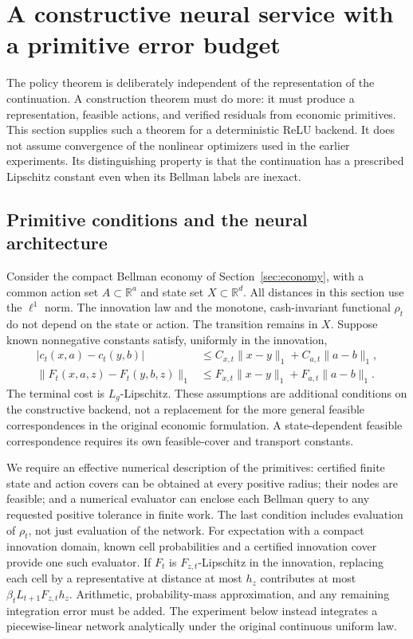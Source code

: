 \section{A constructive neural service with a primitive error budget}\label{sec:constructive45}
The policy theorem is deliberately independent of the representation of the continuation. A construction theorem must do more: it must produce a representation, feasible actions, and verified residuals from economic primitives. This section supplies such a theorem for a deterministic ReLU backend. It does not assume convergence of the nonlinear optimizers used in the earlier experiments. Its distinguishing property is that the continuation has a prescribed Lipschitz constant even when its Bellman labels are inexact.

\subsection{Primitive conditions and the neural architecture}
Consider the compact Bellman economy of Section~\ref{sec:economy}, with a common action set $A\subset\mathbb R^a$ and state set $X\subset\mathbb R^d$. All distances in this section use the $\ell^1$ norm. The innovation law and the monotone, cash-invariant functional $\rho_t$ do not depend on the state or action. The transition remains in $X$. Suppose known nonnegative constants satisfy, uniformly in the innovation,
\begin{align}\label{eq:primitive45}
 |c_t(x,a)-c_t(y,b)|&\le C_{x,t}\|x-y\|_1+C_{a,t}\|a-b\|_1,\\
 \|F_t(x,a,z)-F_t(y,b,z)\|_1&\le F_{x,t}\|x-y\|_1+F_{a,t}\|a-b\|_1.
\end{align}
The terminal cost is $L_g$-Lipschitz. These assumptions are additional conditions on the constructive backend, not a replacement for the more general feasible correspondences in the original economic formulation. A state-dependent feasible correspondence requires its own feasible-cover and transport constants.

We require an effective numerical description of the primitives: certified finite state and action covers can be obtained at every positive radius; their nodes are feasible; and a numerical evaluator can enclose each Bellman query to any requested positive tolerance in finite work. The last condition includes evaluation of $\rho_t$, not just evaluation of the network. For expectation with a compact innovation domain, known cell probabilities and a certified innovation cover provide one such evaluator. If $F_t$ is $F_{z,t}$-Lipschitz in the innovation, replacing each cell by a representative at distance at most $h_z$ contributes at most $\beta_tL_{t+1}F_{z,t}h_z$. Arithmetic, probability-mass approximation, and any remaining integration error must be added. The experiment below instead integrates a piecewise-linear network analytically under the original continuous uniform law.

